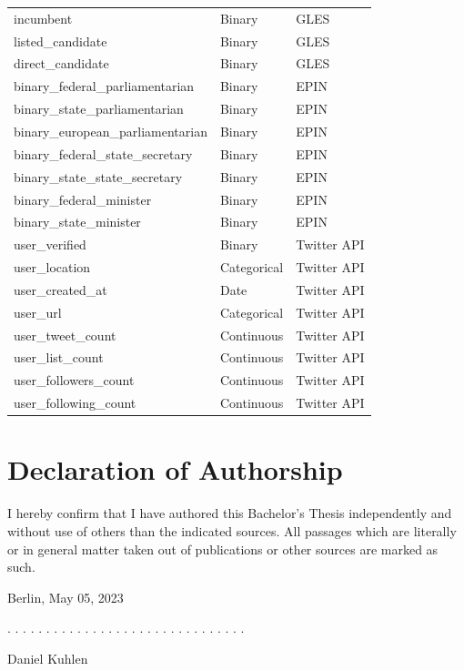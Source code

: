\documentclass[a4paper,11pt]{article}
\newcommand{\thesistype}{Bachelor's Thesis}
\newcommand{\thesisauthor}{Daniel Kuhlen}
\newcommand{\thesisdate}{May 05, 2023}
\begin{document}
\begin{table}[H]
\begin{center}
{\begin{tabularx}{\textwidth}{L|L|L}
        incumbent & Binary & GLES \\
        listed\_candidate & Binary & GLES \\
        direct\_candidate & Binary & GLES \\
        binary\_federal\_parliamentarian & Binary & EPIN \\
        binary\_state\_parliamentarian & Binary & EPIN \\
        binary\_european\_parliamentarian & Binary & EPIN \\
        binary\_federal\_state\_secretary & Binary & EPIN \\
        binary\_state\_state\_secretary & Binary & EPIN \\
        binary\_federal\_minister & Binary & EPIN \\
        binary\_state\_minister & Binary & EPIN \\
        user\_verified & Binary & Twitter API \\
        user\_location & Categorical & Twitter API \\
        user\_created\_at & Date & Twitter API \\
        user\_url & Categorical & Twitter API \\
        user\_tweet\_count & Continuous & Twitter API \\
        user\_list\_count & Continuous & Twitter API \\
        user\_followers\_count & Continuous & Twitter API \\
        user\_following\_count & Continuous & Twitter API \\
        \hline \hline
        \end{tabularx}}
    \end{center}
\end{table}


\newpage
\thispagestyle{empty}
\hypertarget{declaration-of-authorship}{%
\section*{Declaration of Authorship}\label{declaration-of-authorship}}

I hereby confirm that I have authored this \thesistype{} independently and
without use of others than the indicated sources. All passages which are
literally or in general matter taken out of publications or other sources are
marked as such.
\vspace{1cm}

Berlin, \thesisdate{}
\vspace{3cm}

. . . . . . . . . . . . . . . . . . . . . . . . . . . . . . .
\vspace{0.1cm}

\thesisauthor{}
\end{document}

